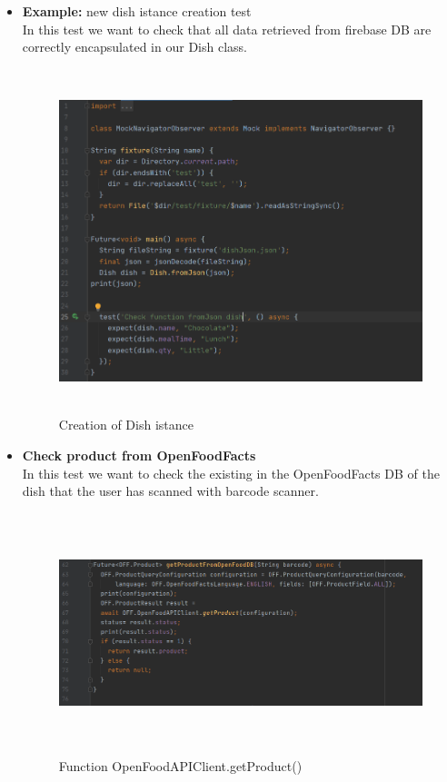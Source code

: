 \documentclass [12pt]{article}
\begin{document}
\begin{itemize}[•]
\item \textbf{Example:} new dish istance creation test\\
In this test we want to check that all data retrieved from firebase DB are correctly encapsulated in our Dish class. 
\begin{figure}[h!]
\centering
\includegraphics[width=\linewidth,height=10cm]{DishCreatedTest.PNG}
\caption{Creation of Dish istance}
\medskip
\small
\end{figure}
\clearpage
\item \textbf{Check product from OpenFoodFacts}\\
In this test we want to check the existing in the OpenFoodFacts DB of the dish that the user has scanned with barcode scanner.  
\begin{figure}[h!]
\centering
\includegraphics[width=\linewidth,height=7cm]{OpenFoodFactsFunction.PNG}
\caption{Function OpenFoodAPIClient.getProduct()}

\end{figure}
\end{itemize}
\end{document}
